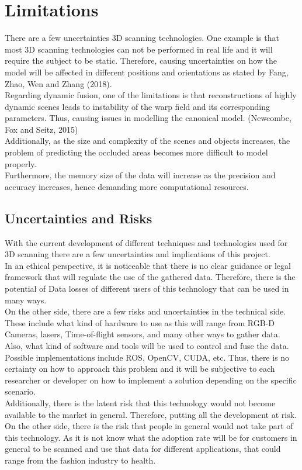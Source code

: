 \documentclass[a4paper]{thesis}
\begin{document}
\section*{{Limitations}}
There are a few uncertainties 3D scanning technologies. One example is that most 3D scanning technologies can not be performed in real life and it will require the subject to be static. Therefore, causing uncertainties on how the model will be affected in different positions and orientations as stated by Fang, Zhao, Wen and Zhang (2018).\\
Regarding dynamic fusion, one of the limitations is that reconstructions of highly dynamic scenes leads to instability of the warp field and its corresponding parameters. Thus, causing issues in modelling the canonical model.  (Newcombe, Fox and Seitz, 2015)\\
Additionally, as the size and complexity of the scenes and objects increases, the problem of predicting the occluded areas becomes more difficult to model properly. \\
Furthermore, the memory size of the data will increase as the precision and accuracy increases, hence demanding more computational resources. 
\subsection*{Uncertainties and Risks}
With the current development of different techniques and technologies used for 3D scanning there are a few uncertainties and implications of this project. \\[10pt]
In an ethical perspective, it is noticeable that there is no clear guidance or legal framework that will regulate the use of the gathered data. Therefore, there is the potential of Data losses of different users of this technology that can be used in many ways. \\[10pt]
On the other side, there are a few risks and uncertainties in the technical side. These include what kind of hardware to use as this will range from RGB-D Cameras, lasers, Time-of-flight sensors, and many other ways to gather data. Also, what kind of software and tools will be used to control and fuse the data.
 Possible implementations include ROS, OpenCV, CUDA, etc. Thus, there is no certainty on how to approach this problem and it will be subjective to each researcher or developer on how to implement a solution depending on the specific scenario. \\ [10pt]
Additionally, there is the latent risk that this technology would not become available to the market in general. Therefore, putting all the development at risk. On the other side, there is the risk that people in general would not take part of this technology. As it is not know what the adoption rate will be for customers in general to be scanned and use that data for different applications, that could range from the fashion industry to health. 

\newpage


\nocite{*}   %

\end{document}
